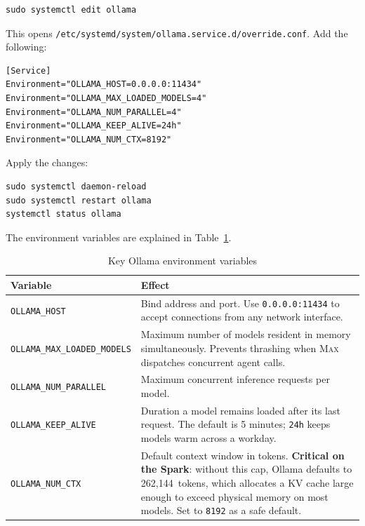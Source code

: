 \begin{lstlisting}[style=bashstyle, caption={Create a systemd override on the Spark}]
sudo systemctl edit ollama
\end{lstlisting}

This opens \texttt{/etc/systemd/system/ollama.service.d/override.conf}.
Add the following:

\begin{lstlisting}[style=bashstyle, caption={Spark Ollama systemd override}]
[Service]
Environment="OLLAMA_HOST=0.0.0.0:11434"
Environment="OLLAMA_MAX_LOADED_MODELS=4"
Environment="OLLAMA_NUM_PARALLEL=4"
Environment="OLLAMA_KEEP_ALIVE=24h"
Environment="OLLAMA_NUM_CTX=8192"
\end{lstlisting}

Apply the changes:

\begin{lstlisting}[style=bashstyle]
sudo systemctl daemon-reload
sudo systemctl restart ollama
systemctl status ollama
\end{lstlisting}

The environment variables are explained in Table~\ref{tab:ollama-env}.

\begin{table}[h]
\centering
\caption{Key Ollama environment variables}
\label{tab:ollama-env}
\begin{tabular}{lp{9cm}}
\toprule
Variable & Effect \\
\midrule
\texttt{OLLAMA\_HOST} &
  Bind address and port. Use \texttt{0.0.0.0:11434} to accept connections
  from any network interface. \\
\texttt{OLLAMA\_MAX\_LOADED\_MODELS} &
  Maximum number of models resident in memory simultaneously. Prevents
  thrashing when \textsc{Max} dispatches concurrent agent calls. \\
\texttt{OLLAMA\_NUM\_PARALLEL} &
  Maximum concurrent inference requests per model. \\
\texttt{OLLAMA\_KEEP\_ALIVE} &
  Duration a model remains loaded after its last request. The default is
  5 minutes; \texttt{24h} keeps models warm across a workday. \\
\texttt{OLLAMA\_NUM\_CTX} &
  Default context window in tokens. \textbf{Critical on the Spark}: without
  this cap, Ollama defaults to 262,144~tokens, which allocates a KV cache
  large enough to exceed physical memory on most models. Set to
  \texttt{8192} as a safe default. \\
\bottomrule
\end{tabular}
\end{table}

